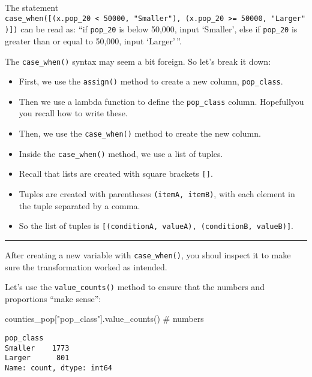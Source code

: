 \documentclass[
  letterpaper,
  DIV=11,
  numbers=noendperiod]{scrreprt}
\newenvironment{Shaded}{\begin{snugshade}}{\end{snugshade}}
\newcommand{\CommentTok}[1]{\textcolor[rgb]{0.37,0.37,0.37}{#1}}
\newcommand{\NormalTok}[1]{\textcolor[rgb]{0.00,0.23,0.31}{#1}}
\newcommand{\StringTok}[1]{\textcolor[rgb]{0.13,0.47,0.30}{#1}}
\providecommand{\tightlist}{%
  \setlength{\itemsep}{0pt}\setlength{\parskip}{0pt}}\usepackage{longtable,booktabs,array}
\begin{document}
The statement
\texttt{case\_when({[}(x.pop\_20\ \textless{}\ 50000,\ "Smaller"),\ (x.pop\_20\ \textgreater{}=\ 50000,\ "Larger"){]})}
can be read as: ``if \texttt{pop\_20} is below 50,000, input `Smaller',
else if \texttt{pop\_20} is greater than or equal to 50,000, input
`Larger'\,''.

The \texttt{case\_when()} syntax may seem a bit foreign. So let's break
it down:

\begin{itemize}
\tightlist
\item
  First, we use the \texttt{assign()} method to create a new column,
  \texttt{pop\_class}.
\item
  Then we use a lambda function to define the \texttt{pop\_class}
  column. Hopefullyou you recall how to write these.
\item
  Then, we use the \texttt{case\_when()} method to create the new
  column.
\item
  Inside the \texttt{case\_when()} method, we use a list of tuples.
\item
  Recall that lists are created with square brackets \texttt{{[}{]}}.
\item
  Tuples are created with parentheses \texttt{(itemA,\ itemB)}, with
  each element in the tuple separated by a comma.
\item
  So the list of tuples is
  \texttt{{[}(conditionA,\ valueA),\ (conditionB,\ valueB){]}}.
\end{itemize}

\begin{center}\rule{0.5\linewidth}{0.5pt}\end{center}

After creating a new variable with \texttt{case\_when()}, you shoul
inspect it to make sure the transformation worked as intended.

Let's use the \texttt{value\_counts()} method to ensure that the numbers
and proportions ``make sense'':

\begin{Shaded}
\begin{Highlighting}[]
\NormalTok{counties\_pop[}\StringTok{"pop\_class"}\NormalTok{].value\_counts() }\CommentTok{\# numbers}
\end{Highlighting}
\end{Shaded}

\begin{verbatim}
pop_class
Smaller    1773
Larger      801
Name: count, dtype: int64
\end{verbatim}
\end{document}
